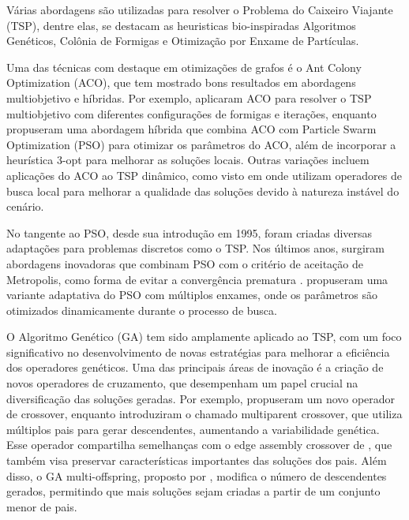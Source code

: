 \documentclass[
	12pt,				%
	openright,			%
	oneside,			%
	a4paper,			%
	chapter=TITLE,		%
	subsection=TITLE,	%
	english,			%
	brazil,				%
	]{abntex2}
\begin{document}

Várias abordagens são utilizadas para resolver o Problema do Caixeiro Viajante (TSP), dentre elas, se destacam as heuristicas bio-inspiradas Algoritmos Genéticos, Colônia de Formigas e Otimização por Enxame de Partículas.

Uma das técnicas com destaque em otimizações de grafos é o Ant Colony Optimization (ACO), que tem mostrado bons resultados em abordagens multiobjetivo e híbridas. Por exemplo, \cite{ariyasingha2015performance} aplicaram ACO para resolver o TSP multiobjetivo com diferentes configurações de formigas e iterações, enquanto \cite{mahi2015new} propuseram uma abordagem híbrida que combina ACO com Particle Swarm Optimization (PSO) para otimizar os parâmetros do ACO, além de incorporar a heurística 3-opt para melhorar as soluções locais. Outras variações incluem aplicações do ACO ao TSP dinâmico, como visto em \cite{mavrovouniotis2016ant} onde utilizam operadores de busca local para melhorar a qualidade das soluções devido à natureza instável do cenário.

No tangente ao PSO, desde sua introdução em 1995, foram criadas diversas adaptações para problemas discretos como o TSP. Nos últimos anos, surgiram abordagens inovadoras que combinam PSO com o critério de aceitação de Metropolis, como forma de evitar a convergência prematura \cite{zhong2018discrete}. \cite{marinakis2015adaptive} propuseram uma variante adaptativa do PSO com múltiplos enxames, onde os parâmetros são otimizados dinamicamente durante o processo de busca.

O Algoritmo Genético (GA) tem sido amplamente aplicado ao TSP, com um foco significativo no desenvolvimento de novas estratégias para melhorar a eficiência dos operadores genéticos. Uma das principais áreas de inovação é a criação de novos operadores de cruzamento, que desempenham um papel crucial na diversificação das soluções geradas. Por exemplo, \cite{hussain2020simulated} propuseram um novo operador de crossover, enquanto \cite{roy2019novel} introduziram o chamado multiparent crossover, que utiliza múltiplos pais para gerar descendentes, aumentando a variabilidade genética. Esse operador compartilha semelhanças com o edge assembly crossover de \cite{sakai2018edge}, que também visa preservar características importantes das soluções dos pais. Além disso, o GA multi-offspring, proposto por \cite{wang2016multi}, modifica o número de descendentes gerados, permitindo que mais soluções sejam criadas a partir de um conjunto menor de pais.
\end{document}
